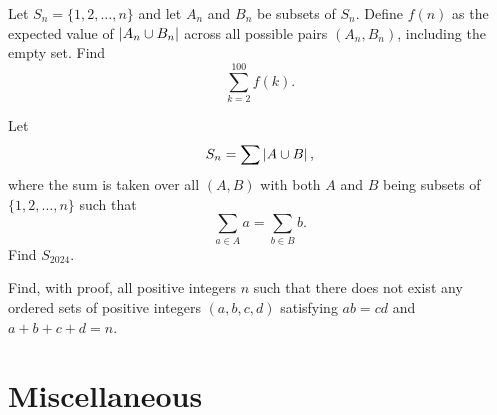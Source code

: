 \documentclass[11pt]{scrartcl}
\begin{document}
\begin{problem}
    Let $S_{n} = \{1, 2, \dots, n\}$ and let $A_{n}$ and $B_{n}$ be subsets of $S_{n}$. Define $f(n)$ as the expected value of $\left\lvert A_{n} \cup B_{n} \right\rvert$ across all possible pairs $(A_{n},B_{n})$, including the empty set. Find
    \[\sum_{k = 2}^{100} f(k).\]
\end{problem}

\begin{problem}
    Let
    \[S_{n} = \sum \left\lvert A \cup B \right\rvert,\]
    where the sum is taken over all $(A,B)$ with both $A$ and $B$ being subsets of $\{1, 2, \dots, n\}$ such that
    \[\sum_{a \in A} a = \sum_{b \in B} b.\]
    Find $S_{2024}$.
\end{problem}

\begin{problem}
    Find, with proof, all positive integers $n$ such that there does not exist any ordered sets of positive integers $(a, b, c, d)$ satisfying $ab = cd$ and $a + b + c + d = n$.
\end{problem}

\section{Miscellaneous}
\end{document}
